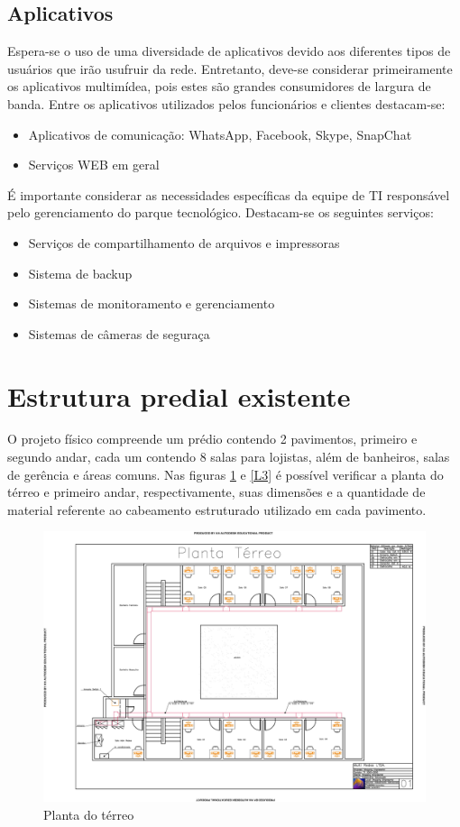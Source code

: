 \documentclass[	DIV=calc,%
							paper=a4,%
							fontsize=12pt,%
							onecolumn]{scrartcl}	 					%
\begin{document}
\subsection{Aplicativos}
Espera-se o uso de uma diversidade de aplicativos devido aos diferentes tipos de usuários que irão usufruir da rede. Entretanto, deve-se considerar primeiramente os aplicativos multimídea, pois estes são grandes consumidores de largura de banda.
Entre os aplicativos utilizados pelos funcionários e clientes destacam-se:
\begin{itemize}
	\item Aplicativos de comunicação: WhatsApp, Facebook, Skype, SnapChat
	\item Serviços WEB em geral
\end{itemize}
É importante considerar as necessidades específicas da equipe de TI responsável pelo gerenciamento do parque tecnológico. Destacam-se os seguintes serviços:
\begin{itemize}
	\item Serviços de compartilhamento de arquivos e impressoras
	\item Sistema de backup 
	\item Sistemas de monitoramento e gerenciamento
	\item Sistemas de câmeras de seguraça
\end{itemize} 


\section{Estrutura predial existente}

O projeto físico compreende um prédio contendo 2 pavimentos, primeiro e segundo andar, cada um contendo 8 salas para lojistas, além de banheiros, salas de gerência e áreas comuns.
Nas figuras \ref{L1} e \ref{L3} é possível verificar a planta do térreo e primeiro andar, respectivamente, suas dimensões e a quantidade de material referente ao cabeamento estruturado utilizado em cada pavimento.

\begin{figure}
\centering
\includegraphics[width=\textwidth]{L1}
\caption{Planta do térreo}
\label{L1}
\end{figure}
\end{document}
